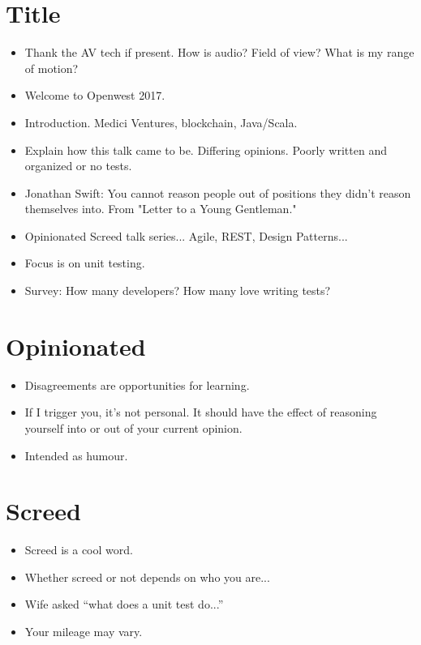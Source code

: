 \documentclass{article}
\begin{document}
\sloppy
\section{Title}
\begin{itemize}
    \item Thank the AV tech if present. How is audio? Field of view? What is
        my range of motion?
    \item Welcome to Openwest 2017.
    \item Introduction. Medici Ventures, blockchain, Java/Scala.
    \item Explain how this talk came to be. Differing opinions. Poorly written
        and organized or no tests.
    \item Jonathan Swift: You cannot reason people out of positions they didn’t
        reason themselves into. From "Letter to a Young Gentleman."
    \item Opinionated Screed talk series... Agile, REST, Design Patterns...
    \item Focus is on unit testing.
    \item Survey: How many developers? How many love writing tests?
\end{itemize}

\newpage
\section{Opinionated}
\begin{itemize}
    \item Disagreements are opportunities for learning.
    \item If I trigger you, it's not personal. It should have the effect of
        reasoning yourself into or out of your current opinion.
    \item Intended as humour.
\end{itemize}

\newpage
\section{Screed}
\begin{itemize}
    \item Screed is a cool word.
    \item Whether screed or not depends on who you are...
    \item Wife asked ``what does a unit test do...''
    \item Your mileage may vary.
\end{itemize}
\end{document}
